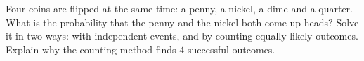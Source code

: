 Four coins are flipped at the same time: a penny, a nickel, a dime and a quarter. What is the probability that the penny and the nickel both come up heads? Solve it in two ways: with independent events, and by counting equally likely outcomes. Explain why the counting method finds $4$ successful outcomes.
